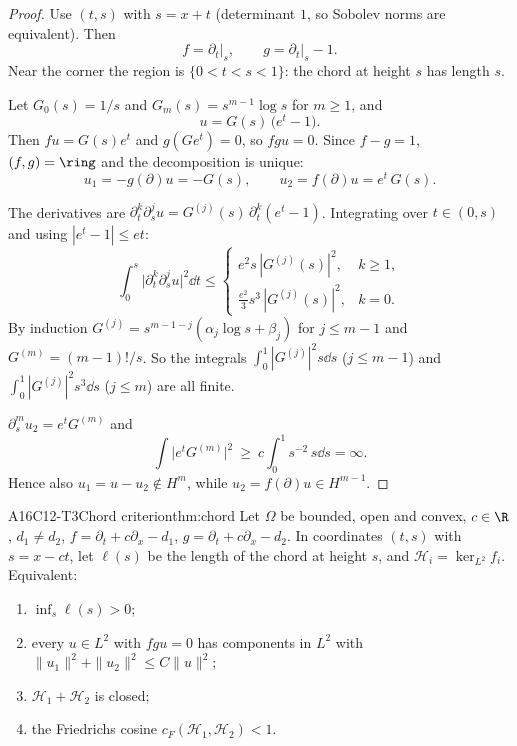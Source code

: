 \begin{proof}
Use $(t,s)$ with $s=x+t$ (determinant $1$, so Sobolev norms are equivalent). Then
\[
f=\partial_t\big|_s,\qquad g=\partial_t\big|_s-1 .
\]
Near the corner the region is $\{0<t<s<1\}$: the chord at height $s$ has length $s$.

Let $G_0(s)=1/s$ and $G_m(s)=s^{m-1}\log s$ for $m\ge1$, and
\[
u=G(s)\,\big(e^t-1\big).
\]
Then $fu=G(s)e^t$ and $g(Ge^t)=0$, so $fgu=0$. Since $f-g=1$, $(f,g)=\ring$ and the decomposition is unique:
\[
u_1=-g(\partial)u=-G(s),\qquad u_2=f(\partial)u=e^t\,G(s).
\]

The derivatives are $\partial_t^k\partial_s^ju=G^{(j)}(s)\,\partial_t^k(e^t-1)$. Integrating over $t\in(0,s)$ and using $|e^t-1|\le et$:
\[
\int_0^s\big|\partial_t^k\partial_s^ju\big|^2\dd t\le
\begin{cases}
e^2s\,|G^{(j)}(s)|^2, & k\ge1,\\[3pt]
\tfrac{e^2}{3}s^3\,|G^{(j)}(s)|^2, & k=0.
\end{cases}
\]
By induction $G^{(j)}=s^{m-1-j}(\alpha_j\log s+\beta_j)$ for $j\le m-1$ and $G^{(m)}=(m-1)!/s$. So the integrals $\int_0^1|G^{(j)}|^2s\dd s$ ($j\le m-1$) and $\int_0^1|G^{(j)}|^2s^3\dd s$ ($j\le m$) are all finite.

$\partial_s^mu_2=e^tG^{(m)}$ and
\[
\int\big|e^tG^{(m)}\big|^2\ \ge\ c\int_0^1s^{-2}\,s\dd s=\infty .
\]
Hence also $u_1=u-u_2\notin H^m$, while $u_2=f(\partial)u\in H^{m-1}$.

\end{proof}

\begin{dimcard}{A16}{C12-T3}{Chord criterion}{\proved}{thm:chord}
Let $\Omega$ be bounded, open and convex, $c\in\R$, $d_1\ne d_2$, $f=\partial_t+c\partial_x-d_1$, $g=\partial_t+c\partial_x-d_2$. In coordinates $(t,s)$ with $s=x-ct$, let $\ell(s)$ be the length of the chord at height $s$, and $\mathcal H_i=\ker_{L^2}f_i$. Equivalent:
\begin{enumerate}[label=(\alph*)]
\item $\inf_s\ell(s)>0$;
\item every $u\in L^2$ with $fgu=0$ has components in $L^2$ with $\|u_1\|^2+\|u_2\|^2\le C\|u\|^2$;
\item $\mathcal H_1+\mathcal H_2$ is closed;
\item the Friedrichs cosine $c_F(\mathcal H_1,\mathcal H_2)<1$.
\end{enumerate}
\end{dimcard}

